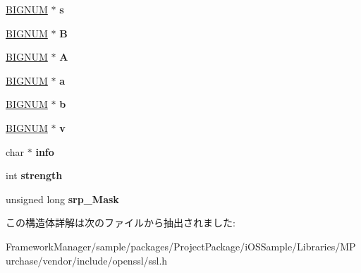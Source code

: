 \begin{DoxyCompactItemize}
\item 
\hypertarget{structsrp__ctx__st_aeabfb75bde4e22d7f33fa49b2ad84c3b}{}\hyperlink{structbignum__st}{B\+I\+G\+N\+U\+M} $\ast$ {\bfseries s}\label{structsrp__ctx__st_aeabfb75bde4e22d7f33fa49b2ad84c3b}

\item 
\hypertarget{structsrp__ctx__st_a7849b7e0d38bddd6243e44f90bc8a48d}{}\hyperlink{structbignum__st}{B\+I\+G\+N\+U\+M} $\ast$ {\bfseries B}\label{structsrp__ctx__st_a7849b7e0d38bddd6243e44f90bc8a48d}

\item 
\hypertarget{structsrp__ctx__st_a65bcccab6ee5eb609c2304fd3a2a7c3f}{}\hyperlink{structbignum__st}{B\+I\+G\+N\+U\+M} $\ast$ {\bfseries A}\label{structsrp__ctx__st_a65bcccab6ee5eb609c2304fd3a2a7c3f}

\item 
\hypertarget{structsrp__ctx__st_a5d063ec2dc87cc7351ced5b25de67e3f}{}\hyperlink{structbignum__st}{B\+I\+G\+N\+U\+M} $\ast$ {\bfseries a}\label{structsrp__ctx__st_a5d063ec2dc87cc7351ced5b25de67e3f}

\item 
\hypertarget{structsrp__ctx__st_aee9feaedd4dd38b5532c35c3b8b366d5}{}\hyperlink{structbignum__st}{B\+I\+G\+N\+U\+M} $\ast$ {\bfseries b}\label{structsrp__ctx__st_aee9feaedd4dd38b5532c35c3b8b366d5}

\item 
\hypertarget{structsrp__ctx__st_a822ab1c65a312a2baefa2c5f35d48ab4}{}\hyperlink{structbignum__st}{B\+I\+G\+N\+U\+M} $\ast$ {\bfseries v}\label{structsrp__ctx__st_a822ab1c65a312a2baefa2c5f35d48ab4}

\item 
\hypertarget{structsrp__ctx__st_a6ca9932a9bf584ced4514a641da677aa}{}char $\ast$ {\bfseries info}\label{structsrp__ctx__st_a6ca9932a9bf584ced4514a641da677aa}

\item 
\hypertarget{structsrp__ctx__st_a7c4b3e2077d11a9ad4b45424bc098148}{}int {\bfseries strength}\label{structsrp__ctx__st_a7c4b3e2077d11a9ad4b45424bc098148}

\item 
\hypertarget{structsrp__ctx__st_a64b3466f134d404daadf0abf37589097}{}unsigned long {\bfseries srp\+\_\+\+Mask}\label{structsrp__ctx__st_a64b3466f134d404daadf0abf37589097}

\end{DoxyCompactItemize}


この構造体詳解は次のファイルから抽出されました\+:\begin{DoxyCompactItemize}
\item 
Framework\+Manager/sample/packages/\+Project\+Package/i\+O\+S\+Sample/\+Libraries/\+M\+Purchase/vendor/include/openssl/ssl.\+h\end{DoxyCompactItemize}
